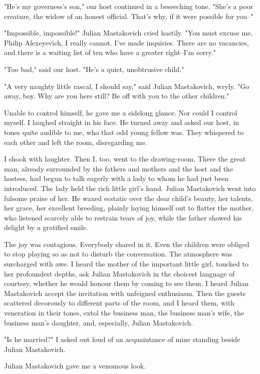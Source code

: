 "He's my governess's son," our host continued in a beseeching tone.
"She's a poor creature, the widow of an honest official. That's why,
if it were possible for you--"

"Impossible, impossible!" Julian Mastakovich cried hastily. "You must
excuse me, Philip Alexeyevich, I really cannot. I've made inquiries.
There are no vacancies, and there is a waiting list of ten who have a
greater right--I'm sorry."

"Too bad," said our host. "He's a quiet, unobtrusive child."

"A very naughty little rascal, I should say," said Julian Mastakovich,
wryly. "Go away, boy. Why are you here still? Be off with you to the
other children."

Unable to control himself, he gave me a sidelong glance. Nor could I
control myself. I laughed straight in his face. He turned away and
asked our host, in tones quite audible to me, who that odd young
fellow was. They whispered to each other and left the room,
disregarding me.

I shook with laughter. Then I, too, went to the drawing-room. There
the great man, already surrounded by the fathers and mothers and the
host and the hostess, had begun to talk eagerly with a lady to whom he
had just been introduced. The lady held the rich little girl's hand.
Julian Mastakovich went into fulsome praise of her. He waxed ecstatic
over the dear child's beauty, her talents, her grace, her excellent
breeding, plainly laying himself out to flatter the mother, who
listened scarcely able to restrain tears of joy, while the father
showed his delight by a gratified smile.

The joy was contagious. Everybody shared in it. Even the children were
obliged to stop playing so as not to disturb the conversation. The
atmosphere was surcharged with awe. I heard the mother of the
important little girl, touched to her profoundest depths, ask Julian
Mastakovich in the choicest language of courtesy, whether he would
honour them by coming to see them. I heard Julian Mastakovich accept
the invitation with unfeigned enthusiasm. Then the guests scattered
decorously to different parts of the room, and I heard them, with
veneration in their tones, extol the business man, the business man's
wife, the business man's daughter, and, especially, Julian
Mastakovich.

"Is he married?" I asked out loud of an acquaintance of mine standing
beside Julian Mastakovich.

Julian Mastakovich gave me a venomous look.

